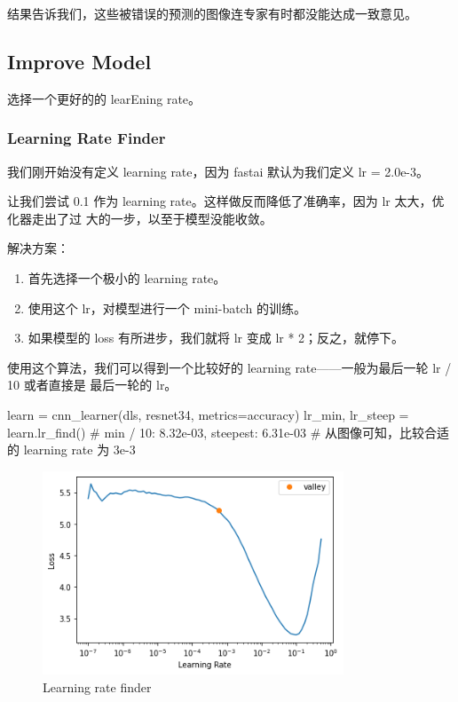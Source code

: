 \documentclass{ctexart}
\newenvironment{monos}{\VerbatimEnvironment\begin{pythoncode}}{\end{pythoncode}}
\begin{document}
结果告诉我们，这些被错误的预测的图像连专家有时都没能达成一致意见。

\subsection{Improve Model}

选择一个更好的的 learE\textbf{}ning rate。

\subsubsection{Learning Rate Finder}

我们刚开始没有定义 learning rate，因为 fastai 默认为我们定义 lr = 2.0e-3。

让我们尝试 0.1 作为 learning rate。这样做反而降低了准确率，因为 lr 太大，优化器走出了过
大的一步，以至于模型没能收敛。

解决方案：

\begin{enumerate}
    \item 首先选择一个极小的 learning rate。
    \item 使用这个 lr，对模型进行一个 mini-batch 的训练。
    \item 如果模型的 loss 有所进步，我们就将 lr 变成 lr * 2；反之，就停下。
\end{enumerate}

使用这个算法，我们可以得到一个比较好的 learning rate——一般为最后一轮 lr / 10 或者直接是
最后一轮的 lr。

\begin{monos}
learn = cnn_learner(dls, resnet34, metrics=accuracy)
lr_min, lr_steep = learn.lr_find() # min / 10: 8.32e-03, steepest: 6.31e-03
# 从图像可知，比较合适的 learning rate 为 3e-3
\end{monos}

\begin{figure}[H]
    \centering
    \includegraphics[width=0.8\textwidth]{assets/lr_finder.png}
    \caption{Learning rate finder}
    \label{fig:lr_finder}
\end{figure}
\end{document}
